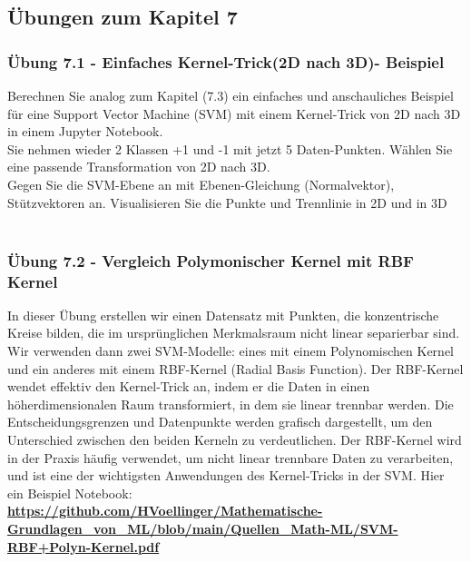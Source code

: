 \documentclass[12pt]{article}
\begin{document}
\subsection{Übungen zum Kapitel 7}



{\color{red}{*******************************************************************\\ 
ab hier bis Ende der Übungen sind die Folien der Vorlesung ML  zu nutzen und diese sind in Latex umzusetzen\\
********************************************************************\\}}
%
\subsubsection{Übung 7.1 - Einfaches Kernel-Trick(2D nach 3D)- Beispiel}
%
Berechnen Sie analog zum Kapitel (7.3) ein einfaches und anschauliches Beispiel für eine Support Vector Machine (SVM) mit einem Kernel-Trick von 2D nach 3D in einem Jupyter Notebook.\\
Sie nehmen wieder 2 Klassen +1 und -1 mit jetzt 5 Daten-Punkten. Wählen Sie eine passende Transformation von 2D nach 3D.\\
Gegen Sie die SVM-Ebene an mit Ebenen-Gleichung (Normalvektor), Stützvektoren an. Visualisieren Sie die Punkte und Trennlinie in 2D und in 3D \\[0.2cm]\\
\subsubsection{Übung 7.2 - Vergleich Polymonischer Kernel mit RBF Kernel}
%
In dieser Übung erstellen wir einen Datensatz mit Punkten, die konzentrische Kreise bilden, die im ursprünglichen Merkmalsraum nicht linear separierbar sind. Wir verwenden dann zwei SVM-Modelle: eines mit einem Polynomischen Kernel und ein anderes mit einem RBF-Kernel (Radial Basis Function). Der RBF-Kernel wendet effektiv den Kernel-Trick an, indem er die Daten in einen höherdimensionalen Raum transformiert, in dem sie linear trennbar werden. Die Entscheidungsgrenzen und Datenpunkte werden grafisch dargestellt, um den Unterschied zwischen den beiden Kerneln zu verdeutlichen.
Der RBF-Kernel wird in der Praxis häufig verwendet, um nicht linear trennbare Daten zu verarbeiten, und ist eine der wichtigsten Anwendungen des Kernel-Tricks in der SVM.
Hier ein Beispiel Notebook:\\[0.5cm]
\textbf{\url{https://github.com/HVoellinger/Mathematische-Grundlagen_von_ML/blob/main/Quellen_Math-ML/SVM-RBF+Polyn-Kernel.pdf}}\\[0.5cm]
\end{document}
